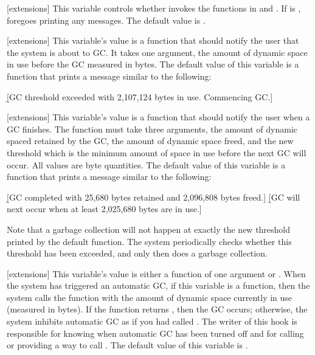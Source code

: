 [extensions]
This variable controls whether  invokes the functions in
 and .  If
 is \nil,  foregoes printing any
messages.  The default value is .
\enddefvar

[extensions]
This variable's value is a function that should notify the user that the system
is about to GC.  It takes one argument, the amount of dynamic space in use
before the GC measured in bytes.  The default value of this variable is a
function that prints a message similar to the following:
\begin{display}
\b{[GC threshold exceeded with 2,107,124 bytes in use.  Commencing GC.]}
\end{display}
\enddefvar

[extensions]
This variable's value is a function that should notify the user when a GC
finishes.  The function must take three arguments, the amount of dynamic spaced
retained by the GC, the amount of dynamic space freed, and the new threshold
which is the minimum amount of space in use before the next GC will occur.  All
values are byte quantities.  The default value of this variable is a function
that prints a message similar to the following:
\begin{display}
\b{[GC completed with 25,680 bytes retained and 2,096,808 bytes freed.]}
\b{[GC will next occur when at least 2,025,680 bytes are in use.]}
\end{display}
\enddefvar

Note that a garbage collection will not happen at exactly the new threshold
printed by the default  function.  The system
periodically checks whether this threshold has been exceeded, and only then
does a garbage collection.

[extensions]
This variable's value is either a function of one argument or \nil.  When the
system has triggered an automatic GC, if this variable is a function, then the
system calls the function with the amount of dynamic space currently in use
(measured in bytes).  If the function returns \nil, then the GC occurs;
otherwise, the system inhibits automatic GC as if you had called
.  The writer of this hook is responsible for knowing when
automatic GC has been turned off and for calling or providing a way to call
.  The default value of this variable is \nil.
\enddefvar

